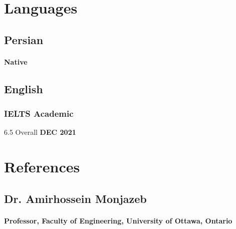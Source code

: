 \documentclass[a4paper]{article}
\begin{document}
\section{Languages}
    
\begin{multicols}{2}
	\subsection{Persian}
	\paragraph{\bfseries Native}
	\vfill\null
	\columnbreak
	\subsection{English}
	\subsubsection{IELTS Academic}
	{6.5 Overall}
	\hfill
	{\bfseries DEC 2021}
\end{multicols}

\section{References}
\subsection{Dr. Amirhossein Monjazeb}
\paragraph{\bfseries Professor, Faculty of Engineering, University of Ottawa, Ontario}
\end{document}
